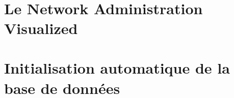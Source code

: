 \documentclass{cls/styleMemoireCeFri}
\begin{document}
  
    \pageTitre
  
  	\pagecolor{white}
  
  	\thispagestyle{empty}\ \clearpage
  
  	\pageJury
  
  	\pagecolor{white}
 

  
  	

  	\tableofcontents
  
  	\listofalgorithms

  	\listoffigures 

  	\listoftables

  	\printglossaries

  	
  	\clearpage
  	
  
  
	\setcounter{page}{1}
	
	\lhead[]{} \rhead[]{} \chead[]{}
	
	\fancyhead[L]{\tiny \leftmark}
	\fancyhead[R]{\scriptsize \rightmark}
	\fancyfoot[C]{\thepage}
	
	\chapter{Le Network Administration Visualized}
    	
    	
    
    \chapter{Initialisation automatique de la base de données}\label{init_db}
    	
   		
   		
   		
	
	
	
	

	\appendix
\end{document}
